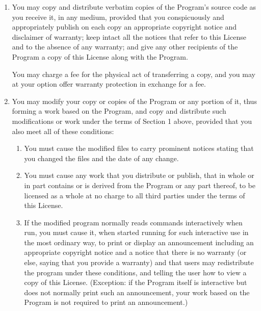 \documentclass{book}
\begin{document}
{\begin{enumerate}
Activities other than copying, distribution and modification are not
covered by this License; they are outside its scope.  The act of
running the Program is not restricted, and the output from the Program
is covered only if its contents constitute a work based on the
Program (independent of having been made by running the Program).
Whether that is true depends on what the Program does.

\item You may copy and distribute verbatim copies of the Program's source
  code as you receive it, in any medium, provided that you conspicuously
  and appropriately publish on each copy an appropriate copyright notice
  and disclaimer of warranty; keep intact all the notices that refer to
  this License and to the absence of any warranty; and give any other
  recipients of the Program a copy of this License along with the Program.

You may charge a fee for the physical act of transferring a copy, and you
may at your option offer warranty protection in exchange for a fee.

\item

You may modify your copy or copies of the Program or any portion
of it, thus forming a work based on the Program, and copy and
distribute such modifications or work under the terms of Section 1
above, provided that you also meet all of these conditions:

\begin{enumerate}

\item 

You must cause the modified files to carry prominent notices stating that
you changed the files and the date of any change.

\item

You must cause any work that you distribute or publish, that in
whole or in part contains or is derived from the Program or any
part thereof, to be licensed as a whole at no charge to all third
parties under the terms of this License.

\item
If the modified program normally reads commands interactively
when run, you must cause it, when started running for such
interactive use in the most ordinary way, to print or display an
announcement including an appropriate copyright notice and a
notice that there is no warranty (or else, saying that you provide
a warranty) and that users may redistribute the program under
these conditions, and telling the user how to view a copy of this
License.  (Exception: if the Program itself is interactive but
does not normally print such an announcement, your work based on
the Program is not required to print an announcement.)


\end{enumerate}
\end{enumerate}}
\end{document}
